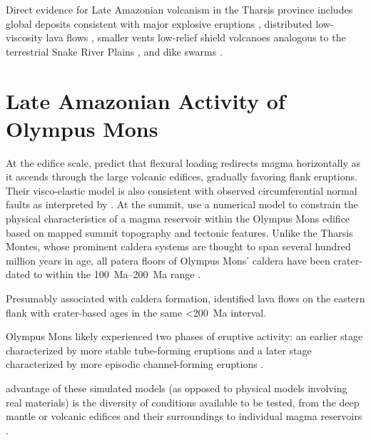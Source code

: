 Direct evidence for Late Amazonian volcanism in the Tharsis province includes global deposits consistent with major explosive eruptions \parencite{hynek_explosive_2003}, distributed low-viscosity lava flows \parencite{hauber_very_2011}, smaller vents \parencite{wilson_fissure_2009,richardson_small_2021} low-relief shield volcanoes analogous to the terrestrial Snake River Plains \parencite{hauber_topography_2009}, and dike swarms \parencite{pieterek_late_2022}.

\section{Late Amazonian Activity of Olympus Mons}

At the edifice scale, \textcite{mcgovern_state_1993} predict that flexural loading redirects magma horizontally as it ascends through the large volcanic edifices, gradually favoring flank eruptions. Their visco-elastic model is also consistent with observed circumferential normal faults as interpreted by \textcite{thomas_flank_1990}. At the summit, \textcite{zuber_caldera_1992} use a numerical model to constrain the physical characteristics of a magma reservoir within the Olympus Mons edifice based on mapped summit topography and tectonic features. Unlike the Tharsis Montes, whose prominent caldera systems are thought to span several hundred million years in age, all patera floors of Olympus Mons' caldera have been crater-dated to within the \qtyrange{100}{200}{Ma} range \parencite{neukum_recent_2004}.

Presumably associated with caldera formation, \textcite{basilevsky_geologically_2006} identified lava flows on the eastern flank with crater-based ages in the same \qty{<200}{Ma} interval.

Olympus Mons likely experienced two phases of eruptive activity: an earlier stage characterized by more stable tube-forming eruptions and a later stage characterized by more episodic channel-forming eruptions \parencite{bleacher_olympus_2007,peters_flank_2017}. 

advantage of these simulated models (as opposed to physical models involving real materials) is the diversity of conditions available to be tested, from the deep mantle \parencite[e.g.,][]{redmond_numerical_2004,ogawa_four-stage_2021} or volcanic edifices and their surroundings \parencite[e.g.,][]{isherwood_volcanic_2013} to individual magma reservoirs \parencite[e.g.,][]{grosfils_magma_2007,grosfils_elastic_2015}.

